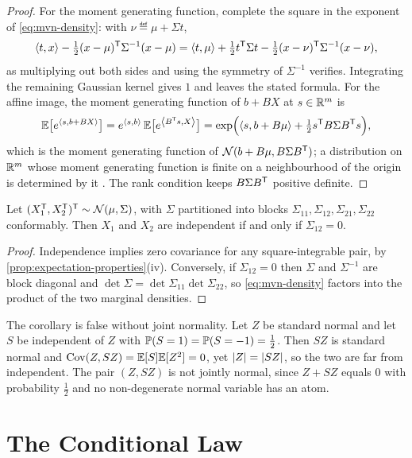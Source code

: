 \begin{proof}
	For the moment generating function, complete the square in the exponent of
	\eqref{eq:mvn-density}: with $\nu\eqdef\mu+\Sigma t$,
	\[
		\left\langle t,x\right\rangle-\tfrac12(x-\mu)^{\mathsf{T}}\Sigma^{-1}(x-\mu)
		=\left\langle t,\mu\right\rangle+\tfrac12t^{\mathsf{T}}\Sigma t
		-\tfrac12(x-\nu)^{\mathsf{T}}\Sigma^{-1}(x-\nu),
	\]
	as multiplying out both sides and using the symmetry of $\Sigma^{-1}$ verifies.
	Integrating the remaining Gaussian kernel gives $1$ and leaves the stated
	formula. For the affine image, the moment generating function of $b+BX$ at
	$s\in\mathbb{R}^{m}$ is
	\[
		\mathbb{E}\bigl[e^{\left\langle s,b+BX\right\rangle}\bigr]
		=e^{\left\langle s,b\right\rangle}\,\mathbb{E}\bigl[e^{\left\langle B^{\mathsf{T}}s,X\right\rangle}\bigr]
		=\exp\Bigl(\left\langle s,b+B\mu\right\rangle+\tfrac12s^{\mathsf{T}}B\Sigma B^{\mathsf{T}}s\Bigr),
	\]
	which is the moment generating function of
	$\mathcal{N}(b+B\mu,B\Sigma B^{\mathsf{T}})$; a distribution on $\mathbb{R}^{m}$ whose
	moment generating function is finite on a neighbourhood of the origin is
	determined by it \autocite[Ch.~5]{ash1999probability}. The rank condition keeps
	$B\Sigma B^{\mathsf{T}}$ positive definite.
\end{proof}

\begin{corollary}\label{cor:mvn-independence}
	Let $(X_1^{\mathsf{T}},X_2^{\mathsf{T}})^{\mathsf{T}}\sim\mathcal{N}(\mu,\Sigma)$, with
	$\Sigma$ partitioned into blocks $\Sigma_{11},\Sigma_{12},\Sigma_{21},
		\Sigma_{22}$ conformably. Then $X_1$ and $X_2$ are independent if and only if
	$\Sigma_{12}=0$.
\end{corollary}

\begin{proof}
	Independence implies zero covariance for any square-integrable pair, by
	\autoref{prop:expectation-properties}(iv). Conversely, if $\Sigma_{12}=0$ then
	$\Sigma$ and $\Sigma^{-1}$ are block diagonal and
	$\det\Sigma=\det\Sigma_{11}\det\Sigma_{22}$, so \eqref{eq:mvn-density} factors
	into the product of the two marginal densities.
\end{proof}

The corollary is false without joint normality. Let $Z$ be standard normal and
let $S$ be independent of $Z$ with $\mathbb{P}(S=1)=\mathbb{P}(S=-1)=\tfrac12$. Then $SZ$
is standard normal and
$\operatorname{Cov}(Z,SZ)=\mathbb{E}[S]\mathbb{E}[Z^{2}]=0$, yet $\left\lvert Z\right\rvert=\left\lvert SZ\right\rvert$, so the two are far from
independent. The pair $(Z,SZ)$ is not jointly normal, since $Z+SZ$ equals $0$
with probability $\tfrac12$ and no non-degenerate normal variable has an atom.

\section{The Conditional Law}\label{sec:app-mvn-conditional}


